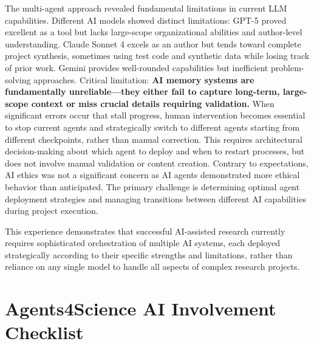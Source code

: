 \documentclass{article}
\begin{document}
The multi-agent approach revealed fundamental limitations in current LLM capabilities. Different AI models showed distinct limitations: GPT-5 proved excellent as a tool but lacks large-scope organizational abilities and author-level understanding. Claude Sonnet 4 excels as an author but tends toward complete project synthesis, sometimes using test code and synthetic data while losing track of prior work. Gemini provides well-rounded capabilities but inefficient problem-solving approaches. Critical limitation: \textbf{AI memory systems are fundamentally unreliable—they either fail to capture long-term, large-scope context or miss crucial details requiring validation.} When significant errors occur that stall progress, human intervention becomes essential to stop current agents and strategically switch to different agents starting from different checkpoints, rather than manual correction. This requires architectural decision-making about which agent to deploy and when to restart processes, but does not involve manual validation or content creation. Contrary to expectations, AI ethics was not a significant concern as AI agents demonstrated more ethical behavior than anticipated. The primary challenge is determining optimal agent deployment strategies and managing transitions between different AI capabilities during project execution.

This experience demonstrates that successful AI-assisted research currently requires sophisticated orchestration of multiple AI systems, each deployed strategically according to their specific strengths and limitations, rather than reliance on any single model to handle all aspects of complex research projects.




\newpage

\section*{Agents4Science AI Involvement Checklist}
\end{document}
